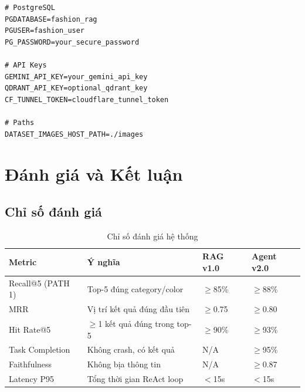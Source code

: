 \documentclass[12pt,a4paper]{report}
\begin{document}
\begin{lstlisting}[caption={Biến môi trường (.env)}]
# PostgreSQL
PGDATABASE=fashion_rag
PGUSER=fashion_user
PG_PASSWORD=your_secure_password

# API Keys
GEMINI_API_KEY=your_gemini_api_key
QDRANT_API_KEY=optional_qdrant_key
CF_TUNNEL_TOKEN=cloudflare_tunnel_token

# Paths
DATASET_IMAGES_HOST_PATH=./images
\end{lstlisting}

\chapter{Đánh giá và Kết luận}

\section{Chỉ số đánh giá}

\begin{table}[H]
\centering
\begin{tabular}{llll}
\toprule
\textbf{Metric} & \textbf{Ý nghĩa} & \textbf{RAG v1.0} & \textbf{Agent v2.0}\\
\midrule
Recall@5 (PATH 1) & Top-5 đúng category/color & $\geq$85\% & $\geq$88\%\\
MRR & Vị trí kết quả đúng đầu tiên & $\geq$0.75 & $\geq$0.80\\
Hit Rate@5 & $\geq$1 kết quả đúng trong top-5 & $\geq$90\% & $\geq$93\%\\
Task Completion & Không crash, có kết quả & N/A & $\geq$95\%\\
Faithfulness & Không bịa thông tin & N/A & $\geq$0.87\\
Latency P95 & Tổng thời gian ReAct loop & $<$15s & $<$15s\\
\bottomrule
\end{tabular}
\caption{Chỉ số đánh giá hệ thống}
\end{table}
\end{document}

